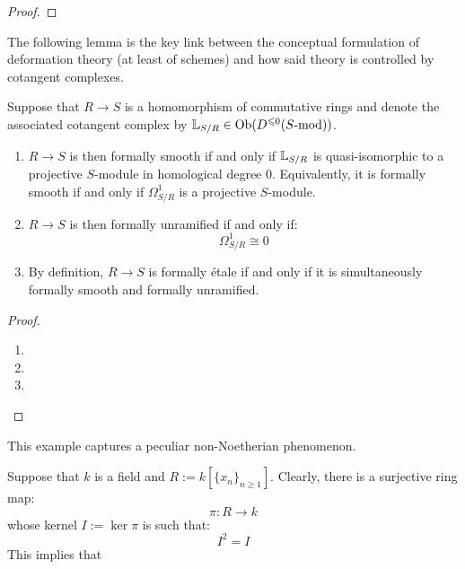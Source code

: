         \begin{lemma}
            
        \end{lemma}
            \begin{proof}
                
            \end{proof}
        The following lemma is the key link between the conceptual formulation of deformation theory (at least of schemes) and how said theory is controlled by cotangent complexes.
        \begin{lemma} \label{lemma: formally_smooth_unramified_and_etale_morphisms_via_cotangent_complexes}
            Suppose that $R \to S$ is a homomorphism of commutative rings and denote the associated cotangent complex by $\mathbb{L}_{S/R} \in \mathrm{Ob}( D^{\leqslant 0}(S\text{-}\mathrm{mod}) )$. 
            \begin{enumerate}
                \item $R \to S$ is then formally smooth if and only if $\mathbb{L}_{S/R}$ is quasi-isomorphic to a projective $S$-module in homological degree $0$. Equivalently, it is formally smooth if and only if $\Omega^1_{S/R}$ is a projective $S$-module.
                \item $R \to S$ is then formally unramified if and only if:
                    $$\Omega^1_{S/R} \cong 0$$
                \item By definition, $R \to S$ is formally \'etale if and only if it is simultaneously formally smooth and formally unramified. 
            \end{enumerate}
        \end{lemma}
            \begin{proof}
                \begin{enumerate}
                    \item 
                    \item 
                    \item 
                \end{enumerate}
            \end{proof}
        \begin{example}
            
        \end{example}
        \begin{example}
            This example captures a peculiar non-Noetherian phenomenon.

            Suppose that $k$ is a field and $R := k[\{x_n\}_{n \geq 1}]$. Clearly, there is a surjective ring map:
                $$\pi: R \to k$$
            whose kernel $I := \ker \pi$ is such that:
                $$I^2 = I$$
            This implies that
        \end{example}

